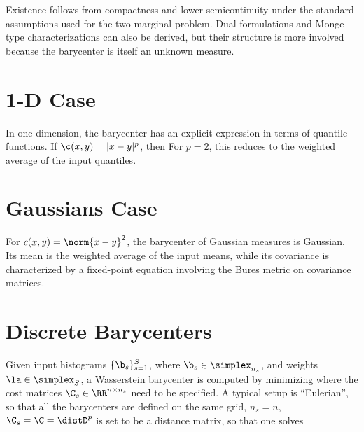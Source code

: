 	Existence follows from compactness and lower semicontinuity under the standard assumptions used for the two-marginal problem. Dual formulations and Monge-type characterizations can also be derived, but their structure is more involved because the barycenter is itself an unknown measure.



\section{1-D Case}


	In one dimension, the barycenter has an explicit expression in terms of quantile functions. If $\c(x,y)=|x-y|^p$, then
	For $p=2$, this reduces to the weighted average of the input quantiles.


\section{Gaussians Case}

	For $c(x,y)=\norm{x-y}^2$, the barycenter of Gaussian measures is Gaussian. Its mean is the weighted average of the input means, while its covariance is characterized by a fixed-point equation involving the Bures metric on covariance matrices.



\section{Discrete Barycenters}

	Given input histograms $\{\b_s\}_{s=1}^S$, where $\b_s \in \simplex_{n_s}$, and weights $\la \in \simplex_S$, a Wasserstein barycenter is computed by minimizing
where the cost matrices $\C_s \in \RR^{n \times n_s}$ need to be specified.
%
A typical setup is ``Eulerian'', so that all the barycenters are defined on the same grid, $n_s=n$, $\C_s=\C=\distD^p$ is set to be a distance matrix, so that one solves


